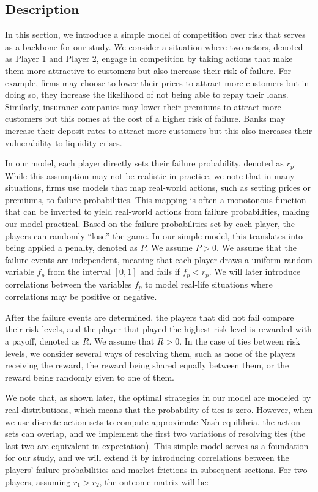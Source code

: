\documentclass[preprint,12pt,authoryear]{elsarticle}
\theoremstyle{definition}
\begin{document}
\subsection{Description}

In this section, we introduce a simple model of competition over risk that serves as a backbone for our study. We consider a situation where two actors, denoted as Player 1 and Player 2, engage in competition by taking actions that make them more attractive to customers but also increase their risk of failure. For example, firms may choose to lower their prices to attract more customers but in doing so, they increase the likelihood of not being able to repay their loans. Similarly, insurance companies may lower their premiums to attract more customers but this comes at the cost of a higher risk of failure. Banks may increase their deposit rates to attract more customers but this also increases their vulnerability to liquidity crises.

In our model, each player directly sets their failure probability, denoted as $r_p$. While this assumption may not be realistic in practice, we note that in many situations, firms use models that map real-world actions, such as setting prices or premiums, to failure probabilities. This mapping is often a monotonous function that can be inverted to yield real-world actions from failure probabilities, making our model practical.
Based on the failure probabilities set by each player, the players can randomly ``lose'' the game. In our simple model, this translates into being applied a penalty, denoted as $P$. We assume $P>0$. We assume that the failure events are independent, meaning that each player draws a uniform random variable $f_p$ from the interval $[0,1]$ and fails if $f_p < r_p$. We will later introduce correlations between the variables $f_p$ to model real-life situations where correlations may be positive or negative.

After the failure events are determined, the players that did not fail compare their risk levels, and the player that played the highest risk level is rewarded with a payoff, denoted as $R$. We assume that $R > 0$. In the case of ties between risk levels, we consider several ways of resolving them, such as none of the players receiving the reward, the reward being shared equally between them, or the reward being randomly given to one of them.

We note that, as shown later, the optimal strategies in our model are modeled by real distributions, which means that the probability of ties is zero. However, when we use discrete action sets to compute approximate Nash equilibria, the action sets can overlap, and we implement the first two variations of resolving ties (the last two are equivalent in expectation). This simple model serves as a foundation for our study, and we will extend it by introducing correlations between the players' failure probabilities and market frictions in subsequent sections.
For two players, assuming $r_1 > r_2$, the outcome matrix will be:
\end{document}
